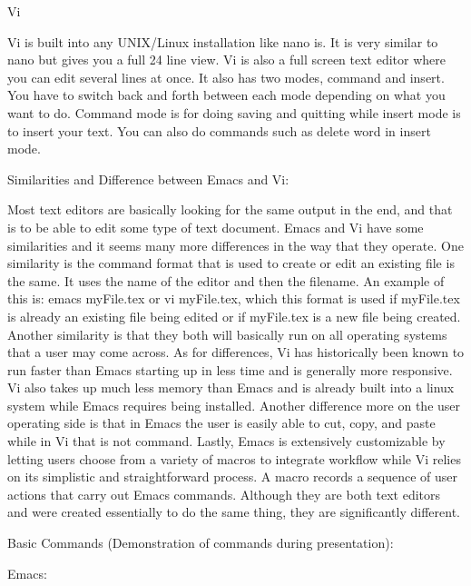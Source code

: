 \documentclass{article} %
\begin{document}
\noindent 

\noindent Vi

\noindent Vi is built into any UNIX/Linux installation like nano is. It is very similar to nano but gives you a full 24 line view. Vi is also a full screen text editor where you can edit several lines at once. It also has two modes, command and insert. You have to switch back and forth between each mode depending on what you want to do. Command mode is for doing saving and quitting while insert mode is to insert your text. You can also do commands such as delete word in insert mode. 

\noindent 

\noindent Similarities and Difference between Emacs and Vi:

\noindent 

\noindent Most text editors are basically looking for the same output in the end, and that is to be able to edit some type of text document. Emacs and Vi have some similarities and it seems many more differences in the way that they operate. One similarity is the command format  that is used to create or edit an existing file is the same. It uses the name of the editor and then the filename. An example of this is: emacs myFile.tex or vi myFile.tex, which this format is used if myFile.tex is already an existing file being edited or if myFile.tex is a new file being created. Another similarity is that they both will basically run on all operating systems that a user may come across. As for differences, Vi has historically been known to run faster than Emacs starting up in less time and is generally more responsive. Vi also takes up much less memory than Emacs and is already built into a linux system while Emacs requires being installed. Another difference more on the user operating side is that in Emacs the user is easily able to cut, copy, and paste while in Vi that is not command. Lastly, Emacs is extensively customizable by letting users choose from a variety of macros to integrate workflow while Vi relies on its simplistic and straightforward process. A macro records a sequence of user actions that carry out Emacs commands. Although they are both text editors and were created essentially to do the same thing, they are significantly different.

\noindent 

\noindent Basic Commands (Demonstration of commands during presentation):

\noindent 

\noindent Emacs:
\end{document}

